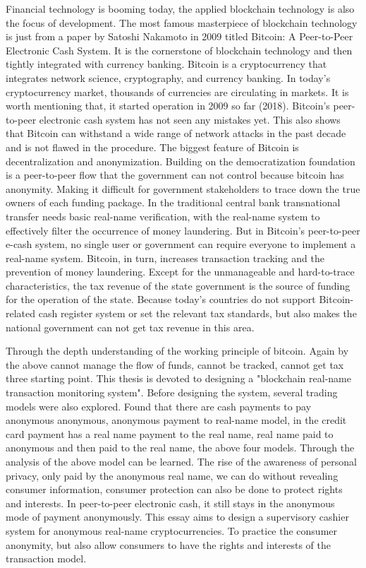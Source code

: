\begin{eabstract}
	Financial technology is booming today, the applied blockchain technology is also the focus of development. The most famous masterpiece of blockchain technology is just from a paper by Satoshi Nakamoto in 2009 titled Bitcoin: A Peer-to-Peer Electronic Cash System. It is the cornerstone of blockchain technology and then tightly integrated with currency banking. Bitcoin is a cryptocurrency that integrates network science, cryptography, and currency banking. In today's cryptocurrency market, thousands of currencies are circulating in markets. It is worth mentioning that, it started operation in 2009 so far (2018). Bitcoin's peer-to-peer electronic cash system has not seen any mistakes yet. This also shows that Bitcoin can withstand a wide range of network attacks in the past decade and is not flawed in the procedure. The biggest feature of Bitcoin is decentralization and anonymization. Building on the democratization foundation is a peer-to-peer flow that the government can not control because bitcoin has anonymity. Making it difficult for government stakeholders to trace down the true owners of each funding package. In the traditional central bank transnational transfer needs basic real-name verification, with the real-name system to effectively filter the occurrence of money laundering. But in Bitcoin's peer-to-peer e-cash system, no single user or government can require everyone to implement a real-name system. Bitcoin, in turn, increases transaction tracking and the prevention of money laundering. Except for the unmanageable and hard-to-trace characteristics, the tax revenue of the state government is the source of funding for the operation of the state. Because today's countries do not support Bitcoin-related cash register system or set the relevant tax standards, but also makes the national government can not get tax revenue in this area. 


	Through the depth understanding of the working principle of bitcoin. Again by the above cannot manage the flow of funds, cannot be tracked, cannot get tax three starting point. This thesis is devoted to designing a "blockchain real-name transaction monitoring system". Before designing the system, several trading models were also explored. Found that there are cash payments to pay anonymous anonymous, anonymous payment to real-name model, in the credit card payment has a real name payment to the real name, real name paid to anonymous and then paid to the real name, the above four models. Through the analysis of the above model can be learned. The rise of the awareness of personal privacy, only paid by the anonymous real name, we can do without revealing consumer information, consumer protection can also be done to protect rights and interests. In peer-to-peer electronic cash, it still stays in the anonymous mode of payment anonymously. This essay aims to design a supervisory cashier system for anonymous real-name cryptocurrencies. To practice the consumer anonymity, but also allow consumers to have the rights and interests of the transaction model. 

\end{eabstract}

